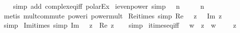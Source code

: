 \begin{isabellebody}
%
\isadelimproof
\ \ %
\endisadelimproof
%
\isatagproof
{}\isamarkupfalse%
\ {\isacharparenleft}{\kern0pt}simp\ add{\isacharcolon}{\kern0pt}\ complex{\isacharunderscore}{\kern0pt}eq{\isacharunderscore}{\kern0pt}iff\ polar{\isacharunderscore}{\kern0pt}Ex{\isacharparenright}{\kern0pt}%
\endisatagproof
{\isafoldproof}%
%
\isadelimproof
\isanewline
%
\endisadelimproof
\isanewline
{}\isamarkupfalse%
\ i{\isacharunderscore}{\kern0pt}even{\isacharunderscore}{\kern0pt}power\ {\isacharbrackleft}{\kern0pt}simp{\isacharbrackright}{\kern0pt}{\isacharcolon}{\kern0pt}\ {\isachardoublequoteopen}{\isasymi}\ {\isacharcircum}{\kern0pt}\ {\isacharparenleft}{\kern0pt}n\ {\isacharasterisk}{\kern0pt}\ {}{\isacharparenright}{\kern0pt}\ {\isacharequal}{\kern0pt}\ {\isacharparenleft}{\kern0pt}{\isacharminus}{\kern0pt}{}{\isacharparenright}{\kern0pt}\ {\isacharcircum}{\kern0pt}\ n{\isachardoublequoteclose}\isanewline
%
\isadelimproof
\ \ %
\endisadelimproof
%
\isatagproof
{}\isamarkupfalse%
\ {\isacharparenleft}{\kern0pt}metis\ mult{\isachardot}{\kern0pt}commute\ power{}{\isacharunderscore}{\kern0pt}i\ power{\isacharunderscore}{\kern0pt}mult{\isacharparenright}{\kern0pt}%
\endisatagproof
{\isafoldproof}%
%
\isadelimproof
\isanewline
%
\endisadelimproof
\isanewline
{}\isamarkupfalse%
\ Re{\isacharunderscore}{\kern0pt}i{\isacharunderscore}{\kern0pt}times\ {\isacharbrackleft}{\kern0pt}simp{\isacharbrackright}{\kern0pt}{\isacharcolon}{\kern0pt}\ {\isachardoublequoteopen}Re\ {\isacharparenleft}{\kern0pt}{\isasymi}\ {\isacharasterisk}{\kern0pt}\ z{\isacharparenright}{\kern0pt}\ {\isacharequal}{\kern0pt}\ {\isacharminus}{\kern0pt}\ Im\ z{\isachardoublequoteclose}\isanewline
%
\isadelimproof
\ \ %
\endisadelimproof
%
\isatagproof
{}\isamarkupfalse%
\ simp%
\endisatagproof
{\isafoldproof}%
%
\isadelimproof
\isanewline
%
\endisadelimproof
\isanewline
{}\isamarkupfalse%
\ Im{\isacharunderscore}{\kern0pt}i{\isacharunderscore}{\kern0pt}times\ {\isacharbrackleft}{\kern0pt}simp{\isacharbrackright}{\kern0pt}{\isacharcolon}{\kern0pt}\ {\isachardoublequoteopen}Im\ {\isacharparenleft}{\kern0pt}{\isasymi}\ {\isacharasterisk}{\kern0pt}\ z{\isacharparenright}{\kern0pt}\ {\isacharequal}{\kern0pt}\ Re\ z{\isachardoublequoteclose}\isanewline
%
\isadelimproof
\ \ %
\endisadelimproof
%
\isatagproof
{}\isamarkupfalse%
\ simp%
\endisatagproof
{\isafoldproof}%
%
\isadelimproof
\isanewline
%
\endisadelimproof
\isanewline
{}\isamarkupfalse%
\ i{\isacharunderscore}{\kern0pt}times{\isacharunderscore}{\kern0pt}eq{\isacharunderscore}{\kern0pt}iff{\isacharcolon}{\kern0pt}\ {\isachardoublequoteopen}{\isasymi}\ {\isacharasterisk}{\kern0pt}\ w\ {\isacharequal}{\kern0pt}\ z\ {\isasymlongleftrightarrow}\ w\ {\isacharequal}{\kern0pt}\ {\isacharminus}{\kern0pt}\ {\isacharparenleft}{\kern0pt}{\isasymi}\ {\isacharasterisk}{\kern0pt}\ z{\isacharparenright}{\kern0pt}{\isachardoublequoteclose}\isanewline

\end{isabellebody}
